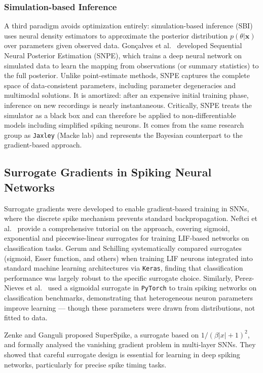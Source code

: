 \subsubsection{Simulation-based Inference}
A third paradigm avoids optimization entirely: simulation-based inference (SBI) uses neural density estimators to approximate the posterior distribution $p(\theta | \mathbf{x})$ over parameters given observed data.
Gon\c{c}alves et al.\ \cite{Goncalves2020} developed Sequential Neural Posterior Estimation (SNPE), which trains a deep neural network on simulated data to learn the mapping from observations (or summary statistics) to the full posterior.
Unlike point-estimate methods, SNPE captures the complete space of data-consistent parameters, including parameter degeneracies and multimodal solutions.
It is amortized: after an expensive initial training phase, inference on new recordings is nearly instantaneous.
Critically, SNPE treats the simulator as a black box and can therefore be applied to non-differentiable models including simplified spiking neurons.
It comes from the same research group as \texttt{Jaxley} (Macke lab) and represents the Bayesian counterpart to the gradient-based approach.

\subsection{Surrogate Gradients in Spiking Neural Networks}\label{sec:rw:sg-snn}

Surrogate gradients were developed to enable gradient-based training in \glspl{SNN}, where the discrete spike mechanism prevents standard backpropagation.
Neftci et al.\ \cite{Neftci2019} provide a comprehensive tutorial on the approach, covering sigmoid, exponential and piecewise-linear surrogates for training \gls{LIF}-based networks on classification tasks.
Gerum and Schilling \cite{Gerum2021} systematically compared surrogates (sigmoid, Esser function, and others) when training \gls{LIF} neurons integrated into standard machine learning architectures via \texttt{Keras}, finding that classification performance was largely robust to the specific surrogate choice.
Similarly, Perez-Nieves et al.\ \cite{Perez-Nieves2021} used a sigmoidal surrogate in \texttt{PyTorch} to train spiking networks on classification benchmarks, demonstrating that heterogeneous neuron parameters improve learning --- though these parameters were drawn from distributions, not fitted to data.

Zenke and Ganguli \cite{Zenke2018} proposed SuperSpike, a surrogate based on $1/(\beta|x|+1)^2$, and formally analysed the vanishing gradient problem in multi-layer \glspl{SNN}.
They showed that careful surrogate design is essential for learning in deep spiking networks, particularly for precise spike timing tasks.

